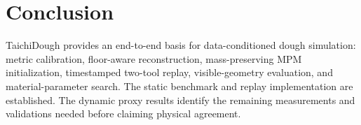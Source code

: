 \documentclass[conference]{IEEEtran}
\begin{document}
\section{Conclusion}
TaichiDough provides an end-to-end basis for data-conditioned dough simulation: metric calibration, floor-aware reconstruction, mass-preserving MPM initialization, timestamped two-tool replay, visible-geometry evaluation, and material-parameter search. The static benchmark and replay implementation are established. The dynamic proxy results identify the remaining measurements and validations needed before claiming physical agreement.



\end{document}
